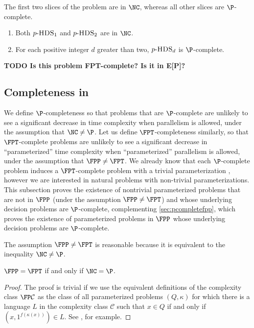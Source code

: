\documentclass{article}
\newcommand{\todo}[1]{\textbf{TODO #1}}
\newcommand{\dash}{\textnormal{-}}
\begin{document}
The first two slices of the problem are in $\NC$, whereas all other slices are $\P$-complete.

\begin{theorem}[{\autocite{am84}}]
  \mbox{}
  \begin{enumerate}
  \item Both $p\dash\textsc{HDS}_1$ and $p \dash \textsc{HDS}_2$ are in $\NC$.
  \item For each positive integer $d$ greater than two, $p \dash \textsc{HDS}_d$ is $\P$-complete.
  \end{enumerate}
\end{theorem}


\todo{Is this problem FPT-complete? Is it in E[P]?}

\subsection{Completeness in \texorpdfstring{\FPT}{FPT}}

We define $\P$-completeness so that problems that are $\P$-complete are unlikely to see a significant decrease in time complexity when parallelism is allowed, under the assumption that $\NC \neq \P$.
Let us define $\FPT$-completeness similarly, so that $\FPT$-complete problems are unlikely to see a significant decrease in ``parameterized'' time complexity when ``parameterized'' parallelism is allowed, under the assumption that $\FPP \neq \FPT$.
We already know that each $\P$-complete problem induces a $\FPT$-complete problem with a trivial parameterization \autocite[Proposition~14]{fg03}, however we are interested in natural problems with non-trivial parameterizations.
This subsection proves the existence of nontrivial parameterized problems that are not in $\FPP$ (under the assumption $\FPP \neq \FPT$) and whose underlying decision problems are $\P$-complete, complementing \autoref{sec:pcompletefpp}, which proves the existence of parameterized problems in $\FPP$ whose underlying decision problems are $\P$-complete.

The assumption $\FPP \neq \FPT$ is reasonable because it is equivalent to the inequality $\NC \neq \P$.

\begin{proposition}
  $\FPP = \FPT$ if and only if $\NC = \P$.
\end{proposition}
\begin{proof}
  The proof is trivial if we use the equivalent definitions of the complexity class $\FP \mathcal{C}$ as the class of all parameterized problems $(Q, \kappa)$ for which there is a language $L$ in the complexity class $\mathcal{C}$ such that $x \in Q$ if and only if $(x, 1^{f(\kappa(x))}) \in L$.
  See \autocite{fg03}, for example.
\end{proof}
\end{document}
